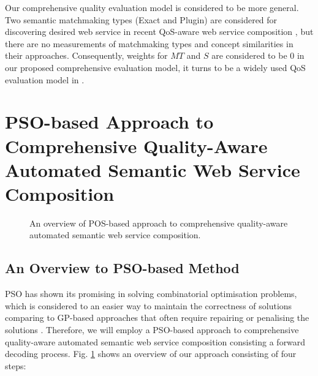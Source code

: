 \documentclass{llncs}
\begin{document}
Our comprehensive quality evaluation model is considered to be more general. Two semantic matchmaking types (Exact and Plugin) are considered for discovering desired web service in recent QoS-aware web service composition  \cite{ma2015hybrid,da2016particle,da2015graphevol}, but there are no measurements of matchmaking types and concept similarities in their approaches. Consequently, weights for $MT$ and $S$ are considered to be 0 in our proposed comprehensive evaluation model, it turns to be a widely used QoS evaluation model in \cite{ma2015hybrid,da2016particle,da2015graphevol}.


\section{PSO-based Approach to Comprehensive Quality-Aware Automated Semantic Web Service Composition}\label{qswsc_approach}

\begin{figure}[h]
\centering
{}
 \caption{An overview of POS-based approach to comprehensive quality-aware automated semantic web service composition.}
 \label{overview}
\end{figure}


\subsection{An Overview to PSO-based Method}\label{PSO_based_approach}

PSO has shown its promising in solving combinatorial optimisation problems, which is considered to an easier way to maintain the correctness of solutions comparing to GP-based approaches that often require repairing or penalising the solutions \cite{da2016particle}. Therefore, we will employ a PSO-based approach to comprehensive quality-aware automated semantic web service composition consisting a forward decoding process. Fig. \ref{overview} shows an overview of our approach consisting of four steps: 
\end{document}
